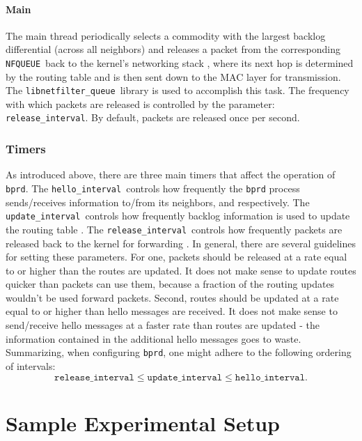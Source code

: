 \documentclass{article}
\newcommand{\bprd}{\texttt{bprd}\xspace}
\newcommand{\hellointerval}{\texttt{hello\_interval}}
\newcommand{\libnetfilterqueue}{\texttt{libnetfilter\_queue}}
\newcommand{\nfqueue}{\texttt{NFQUEUE}}
\newcommand{\releaseinterval}{\texttt{release\_interval}}
\newcommand{\updateinterval}{\texttt{update\_interval}}
\newcommand*\circled[1]{\tikz[baseline=(char.base)]{
                \node[shape=circle,draw,inner sep=2pt] (char) {#1};}}
\begin{document}
\paragraph{Main} The main thread periodically selects a commodity with the largest backlog differential (across all neighbors) and releases a packet from the corresponding \nfqueue\ back to the kernel's networking stack \circled{6}, where its next hop is determined by the routing table and is then sent down to the MAC layer for transmission.
The \libnetfilterqueue\ library is used to accomplish this task.
The frequency with which packets are released is controlled by the parameter: \releaseinterval.
By default, packets are released once per second.


\subsubsection{Timers}

As introduced above, there are three main timers that affect the operation of \bprd.
The \hellointerval\ controls how frequently the \bprd process sends/receives information to/from its neighbors, \circled{4} and \circled{3} respectively.
The \updateinterval\ controls how frequently backlog information is used to update the routing table \circled{5}.
The \releaseinterval\ controls how frequently packets are released back to the kernel for forwarding \circled{6}.
In general, there are several guidelines for setting these parameters.
For one, packets should be released at a rate equal to or higher than the routes are updated.
It does not make sense to update routes quicker than packets can use them, because a fraction of the routing updates wouldn't be used forward packets.
Second, routes should be updated at a rate equal to or higher than hello messages are received.
It does not make sense to send/receive hello messages at a faster rate than routes are updated - the information contained in the additional hello messages goes to waste.
Summarizing, when configuring \bprd, one might adhere to the following ordering of intervals:
%
\begin{equation}
  \releaseinterval \leq \updateinterval \leq \hellointerval.
\end{equation}


\section{Sample Experimental Setup}\label{sec:sample-experiment}
\end{document}
